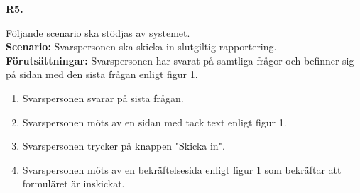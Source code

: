 \documentclass{article}
\begin{document}
   \vspace{1em}
\noindent \large{\textbf{R5.}}
    \normalsize{Följande scenario ska stödjas av systemet.
        \\
       \textbf{Scenario:} Svarspersonen ska skicka in slutgiltig rapportering.
        \\
        \textbf{Förutsättningar:} Svarspersonen har svarat på samtliga frågor och befinner sig på sidan med den sista frågan enligt figur 1.
            \begin{enumerate}
                \item Svarspersonen svarar på sista frågan.
                \item Svarspersonen möts av en sidan med tack text enligt figur 1.
                \item Svarspersonen trycker på knappen "Skicka in".
                \item  Svarspersonen möts av en bekräftelsesida enligt figur 1 som bekräftar att formuläret är inskickat.
            \end{enumerate}
}
\end{document}
